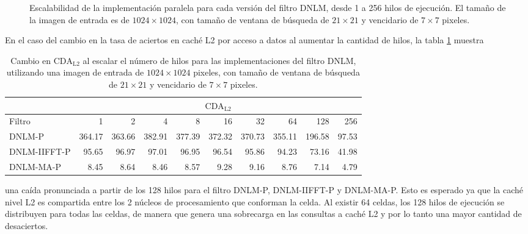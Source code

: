 \begin{figure}[htb]
\centering
  \caption[Escalabilidad de las implementaciones paralelas del filtro DNLM]{Escalabilidad de la implementación paralela para cada versión del filtro DNLM, desde 1 a 256 hilos de ejecución. El tama\~no de la imagen de entrada es de $1024\times1024$, con tama\~no de ventana de búsqueda de $21 \times 21$ y vencidario de $7 \times 7$ pixeles.\label{fig:scalability}}
  \end{figure}
 

En el caso del cambio en la tasa de aciertos en cach\'e L2 por acceso a datos al aumentar la cantidad de hilos, la tabla \ref{tabla:cda_l2} muestra
%
\begin{table}[htb]
\centering
\setlength\tabcolsep{2.5pt}
\setlength{\textfloatsep}{20mm}
\caption[Cambio en la raz\'on de c\'omputo en caché L2 por acceso a datos al escalar el n\'umero de hilos]{Cambio en  $\text{CDA}_\text{L2}$ al escalar el n\'umero de hilos para las implementaciones del filtro DNLM, utilizando una imagen de entrada de $1024 \times 1024$ pixeles, con tama\~no de ventana de búsqueda de $21 \times 21$ y vencidario de $7 \times 7$ pixeles. \label{tabla:cda_l2}}
\begin{tabular}{lrrrrrrrrr}
& \multicolumn{9}{c}{$\text{CDA}_\text{L2}$} \tabularnewline
\hline
 Filtro & 1 & 2 & 4 & 8 & 16 & 32 & 64 & 128 & 256 \tabularnewline
\hline
DNLM-P & 364.17 & 363.66 & 382.91 & 377.39 & 372.32 & 370.73 & 355.11 & 196.58 & 97.53	 \tabularnewline
DNLM-IIFFT-P & 95.65 & 96.97 & 97.01 & 96.95 & 96.54 & 95.86 & 94.23 & 73.16 & 41.98 \tabularnewline
DNLM-MA-P & 8.45 & 8.64 & 8.46 & 8.57 & 9.28 & 9.16 & 8.76 & 7.14 & 4.79 \tabularnewline
\end{tabular}
\end{table}
%
una ca\'ida pronunciada a partir de los 128 hilos para el filtro DNLM-P, DNLM-IIFFT-P y DNLM-MA-P. Esto es esperado ya que la cach\'e nivel L2 es compartida entre los 2 n\'ucleos de procesamiento que conforman la celda. Al existir 64 celdas, los 128 hilos de ejecuci\'on se distribuyen para todas las celdas, de manera que genera una sobrecarga en las consultas a cach\'e L2 y por lo tanto una mayor cantidad de desaciertos.  


